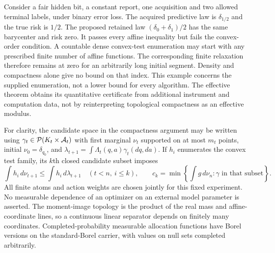 \begin{remark}\label{rem:obstruction_rate}
Consider a fair hidden bit, a constant report, one acquisition and two allowed terminal labels, under binary error loss. The acquired predictive law is $\delta_{1/2}$ and the true risk is $1/2$. The proposed retained law $(\delta_0+\delta_1)/2$ has the same barycenter and risk zero. It passes every affine inequality but fails the convex-order condition. A countable dense convex-test enumeration may start with any prescribed finite number of affine functions. The corresponding finite relaxation therefore remains at zero for an arbitrarily long initial segment. Density and compactness alone give no bound on that index. This example concerns the supplied enumeration, not a lower bound for every algorithm. The effective theorem obtains its quantitative certificate from additional instrument and computation data, not by reinterpreting topological compactness as an effective modulus.
\end{remark}

For clarity, the candidate space in the compactness argument may be written using $\gamma_t\in\mathcal P(K_t\times\mathcal A_t)$ with first marginal $\nu_t$ supported on at most $m_t$ points, initial $\nu_0=\delta_{q_0}$, and $\lambda_{t+1}=\int\Lambda_t(q,a)\gamma_t(dq,da)$. If $h_i$ enumerates the convex test family, its $k$th closed candidate subset imposes
\[
 \int h_i\,d\nu_{t+1}\le\int h_i\,d\lambda_{t+1}
 \quad (t<n,\ i\le k),\qquad
 c_k=\min\left\{\int g\,d\nu_n:\gamma\text{ in that subset}\right\}.
\]
All finite atoms and action weights are chosen jointly for this fixed experiment. No measurable dependence of an optimizer on an external model parameter is asserted. The moment-image topology is the product of the real mass and affine-coordinate lines, so a continuous linear separator depends on finitely many coordinates. Completed-probability measurable allocation functions have Borel versions on the standard-Borel carrier, with values on null sets completed arbitrarily.
